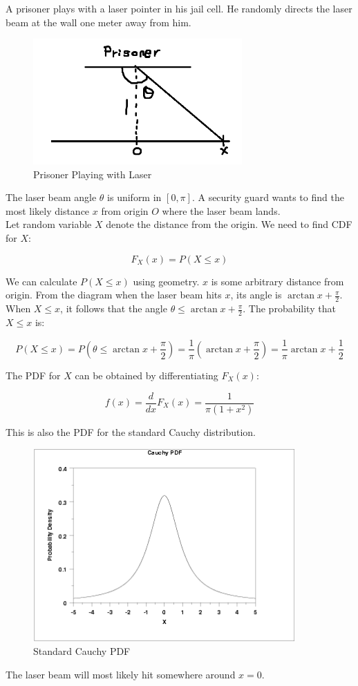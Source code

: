 \begin{texample}
	A prisoner plays with a laser pointer in his jail cell. He randomly directs the laser beam at the wall one meter away from him.
	
	\begin{figure}[H]
		\centering
		\includegraphics[width=80mm]{18.png}
		\caption{Prisoner Playing with Laser}
	\end{figure}
	
	The laser beam angle $\theta$ is uniform in $[0, \pi]$. A security guard wants to find the most likely distance $x$ from origin $O$ where the laser beam lands. \\
	
	Let random variable $X$ denote the distance from the origin. We need to find CDF for $X$:
	
	$$F_X(x)=P(X\le x)$$
	
	We can calculate $P(X\le x)$ using geometry. $x$ is some arbitrary distance from origin. From the diagram when the laser beam hits $x$, its angle is $\arctan x+\frac{\pi}{2}$. When $X\le x$, it follows that the angle $\theta \le \arctan x+\frac{\pi}{2}$. The probability that $X\le x$ is:
	
	$$P(X\le x)=P(\theta \le \arctan x+\frac{\pi}{2})=\frac{1}{\pi}\left( \arctan x+\frac{\pi}{2} \right)=\frac{1}{\pi}\arctan x+\frac12$$
	
	The PDF for $X$ can be obtained by differentiating $F_X(x)$:
	
	$$f(x)=\frac{d}{dx}F_X(x)=\frac{1}{\pi (1+x^2)}$$
	
	This is also the PDF for the standard Cauchy distribution.
	
	\begin{figure}[H]
		\centering
		\includegraphics[width=100mm]{19.png}
		\caption{Standard Cauchy PDF}
	\end{figure}
	
	The laser beam will most likely hit somewhere around $x=0$.
\end{texample}

